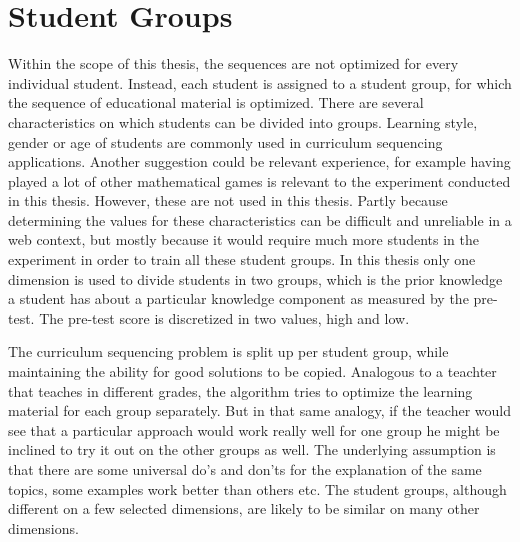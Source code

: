 \section{Student Groups}
\label{sec:task_student_groups}
Within the scope of this thesis, the sequences are not optimized for every
individual student. Instead, each student is assigned to a student group, for
which the sequence of educational material is optimized. There are several
characteristics on which students can be divided into groups. Learning style,
gender or age of students are commonly used in curriculum sequencing %
applications. Another suggestion could be relevant
experience, for example having played a lot of other mathematical games is
relevant to the experiment conducted in this thesis. However, these are not
used in this thesis. Partly because determining the values for these
characteristics can be difficult and unreliable in a web context, but mostly
because it would require much more students in the experiment in order to train
all these student groups. In this thesis only one dimension is used to divide
students in two groups, which is the prior knowledge a student has about a
particular knowledge component as measured by the pre-test. The pre-test score
is discretized in two values, high and low.

The curriculum sequencing problem is split up per student group,
while maintaining the ability for good solutions to be copied.
Analogous to a teachter that teaches in different grades, the algorithm
tries to optimize the learning material for each group separately. But
in that same analogy, if the teacher would see that a particular
approach would work really well for one group he might be inclined to
try it out on the other groups as well. The underlying assumption is
that there are some universal do's and don'ts for the explanation of
the same topics, some examples work better than others etc. The student
groups, although different on a few selected dimensions, are likely to
be similar on many other dimensions.


